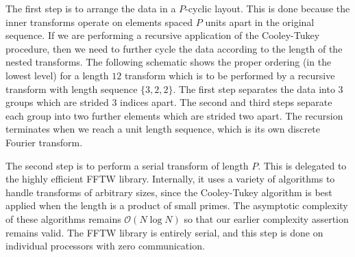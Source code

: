 \documentclass{article}
\theoremstyle{definition}
\begin{document}
The first step is to arrange the data in a $P$-cyclic layout. This is done
because the inner transforms operate on elements spaced $P$ units apart in the
original sequence. If we are performing a recursive application of the
Cooley-Tukey procedure, then we need to further cycle the data according to the
length of the nested transforms. The following schematic shows the proper
ordering (in the lowest level) for a length $12$ transform which is to be
performed by a recursive transform with length sequence $\{3, 2, 2\}$. The first step
separates the data into $3$ groups which are strided $3$ indices apart. The
second and third steps separate each group into two further elements which are
strided two apart. The recursion terminates when we reach a unit length
sequence, which is its own discrete Fourier transform.


The second step is to perform a serial transform of length $P$. This is
delegated to the highly efficient FFTW library. Internally, it uses a variety of
algorithms\cite{FFTW05} to handle transforms of arbitrary sizes, since the
Cooley-Tukey algorithm is best applied when the length is a product of small
primes. The asymptotic complexity of these algorithms remains $\mathcal{O}(N
\log N)$ so that our earlier complexity assertion remains valid. The FFTW
library is entirely serial, and this step is done on individual processors with
zero communication.
\end{document}
